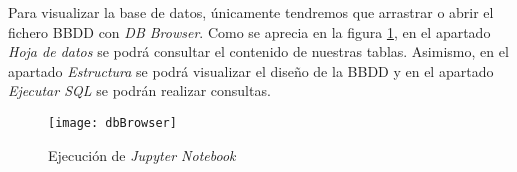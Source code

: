 Para visualizar la base de datos, únicamente tendremos que arrastrar o abrir el fichero BBDD con \emph{DB Browser}. Como se aprecia en la figura \ref{fig:dbBrowser}, en el apartado \emph{Hoja de datos} se podrá consultar el contenido de nuestras tablas. Asimismo, en el apartado \emph{Estructura} se podrá visualizar el diseño de la BBDD y en el apartado \emph{Ejecutar SQL} se podrán realizar consultas.

\begin{figure}%
		\centering
		\texttt{[image: dbBrowser]}
		\caption{Ejecución de \emph{Jupyter Notebook}}\label{fig:dbBrowser}
	\end{figure} 











